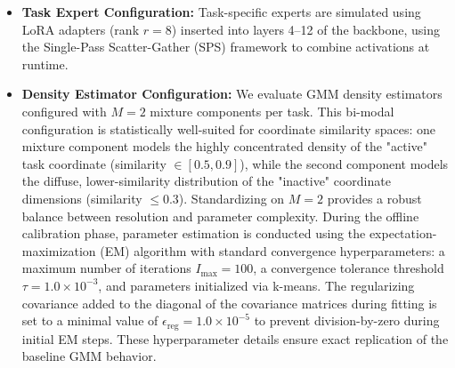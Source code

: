 \begin{itemize}
    To quantitatively validate this design choice, we perform a systematic representation sweep from Layer 1 to Layer 5 of our frozen Vision Transformer backbone, measuring the **Average Coordinate Separation (ACS)** and **Inter-Task Centroid Cosine Similarity** over 64 calibration samples per task. The ACS is formulated as $\text{ACS} = \mathbb{E}_{b \in \mathcal{C}_k} \left[ u_{k, b} - \frac{1}{K-1} \sum_{k' \neq k} u_{k', b} \right]$, representing the average margin between a sample's active similarity coordinate and its inactive task coordinates. As summarized in Table~\ref{submission:tab:layer_sensitivity}, Layer 1 (Block 0) exhibits virtually zero task separation ($\text{ACS} = 0.0005$) and near-complete centroid overlap ($0.9995$), mathematically verifying that primitive features are highly shared across tasks. While moving to Layer 5 (Block 4) maximizes task separation ($\text{ACS} = 0.0757$), it reduces the number of downstream expert-enhanced layers from 9 to 7, significantly compromising the representation learning capacity of our specialized expert adapters. Layer 3 represents the optimal system-level sweet spot, providing robust coordinate task-separation ($\text{ACS} = 0.0297$, over an order of magnitude improvement relative to Layer 1) while preserving 9 downstream blocks (Layers 4--12) for dynamic, sample-wise expert activation.
    \item {\bf Task Expert Configuration:} Task-specific experts are simulated using LoRA adapters (rank $r=8$) inserted into layers 4--12 of the backbone, using the Single-Pass Scatter-Gather (SPS) framework to combine activations at runtime.
    \item {\bf Density Estimator Configuration:} We evaluate GMM density estimators configured with $M=2$ mixture components per task. This bi-modal configuration is statistically well-suited for coordinate similarity spaces: one mixture component models the highly concentrated density of the "active" task coordinate (similarity $\in [0.5, 0.9]$), while the second component models the diffuse, lower-similarity distribution of the "inactive" coordinate dimensions (similarity $\le 0.3$). Standardizing on $M=2$ provides a robust balance between resolution and parameter complexity. During the offline calibration phase, parameter estimation is conducted using the expectation-maximization (EM) algorithm with standard convergence hyperparameters: a maximum number of iterations $I_{\text{max}} = 100$, a convergence tolerance threshold $\tau = 1.0 \times 10^{-3}$, and parameters initialized via k-means. The regularizing covariance added to the diagonal of the covariance matrices during fitting is set to a minimal value of $\epsilon_{\text{reg}} = 1.0 \times 10^{-5}$ to prevent division-by-zero during initial EM steps. These hyperparameter details ensure exact replication of the baseline GMM behavior.

\end{itemize}
